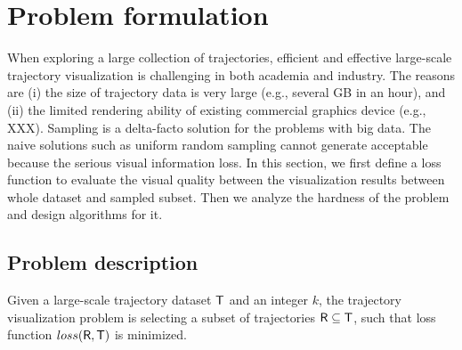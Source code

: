 \section{Problem formulation}
When exploring a large collection of trajectories, efficient and effective large-scale trajectory visualization is challenging in both academia and industry.
The reasons are (i) the size of trajectory data is very large (e.g., several GB in an hour),
and (ii) the limited rendering ability of existing commercial graphics device (e.g., XXX).
Sampling is a delta-facto solution for the problems with big data. The naive solutions such as uniform random sampling cannot generate acceptable because the serious visual information loss. In this section, we first define a loss function to evaluate the visual quality between the visualization results between whole dataset and sampled subset. Then we analyze the hardness of the problem and design algorithms for it.  

\subsection{Problem description}
\begin{problem}\label{prob:def}
Given a large-scale trajectory dataset $\mathsf{T}$ and an integer $k$,
the trajectory visualization problem is selecting a subset of trajectories $\mathsf{R} \subseteq \mathsf{T}$, such that loss function $loss(\mathsf{R},\mathsf{T})$ is minimized.
\end{problem}

